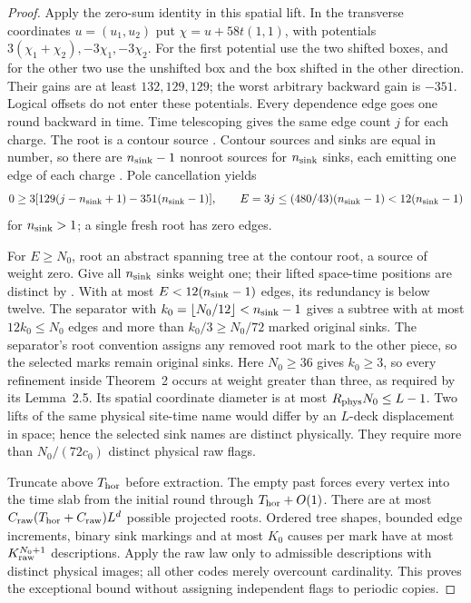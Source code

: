 \begin{proof}
Apply the zero-sum identity \cite[Lemma~41]{SST2026} in this spatial lift.
In the transverse coordinates \(u=(u_1,u_2)\) put
\(\chi=u+58t(1,1)\), with potentials
\(3(\chi_1+\chi_2),-3\chi_1,-3\chi_2\).
For the first potential use the two shifted boxes, and for the other two
use the unshifted box and the box shifted in the other direction.
Their gains are at least \(132,129,129\); the worst arbitrary backward
gain is \(-351\). Logical offsets do not enter these potentials.
Every dependence edge goes one round backward in time. Time telescoping
\cite[(5.13) in the proof of Lemma~38]{SST2026} gives the same edge
count \(j\) for each charge. The root is a contour source
\cite[Definitions~15--16]{SST2026}. Contour sources and sinks are equal in
number, so there are \(n_{\rm sink}-1\) nonroot sources for \(n_{\rm sink}\) sinks, each
emitting one edge of each charge \cite[(5.23) in the proof of Lemma~40]{SST2026}. Pole cancellation yields
\[
 0\ge3[129(j-n_{\rm sink}+1)-351(n_{\rm sink}-1)],\qquad
 E=3j\le(480/43)(n_{\rm sink}-1)<12(n_{\rm sink}-1)
\]
for \(n_{\rm sink}>1\); a single fresh root has zero edges.

For \(E\ge N_0\), root an abstract spanning tree at the contour root,
a source of weight zero. Give all \(n_{\rm sink}\) sinks weight one; their lifted
space-time positions are distinct by \mbox{\cite[Definition~17(i)]{SST2026}}. With at most
\(E<12(n_{\rm sink}-1)\) edges, its redundancy is below twelve. The separator
\mbox{\cite[Definition~2.4, Lemma~2.5 and Theorem~2 (Tree Separator)]{Gacs2021}} with
\(k_0=\lfloor N_0/12\rfloor<n_{\rm sink}-1\) gives a subtree with at most
\(12k_0\le N_0\) edges and more than \(k_0/3\ge N_0/72\) marked
original sinks. The separator's root convention assigns any removed
root mark to the other piece, so the selected marks remain original
sinks. Here \(N_0\ge36\) gives \(k_0\ge3\), so every refinement
inside Theorem~2 occurs at weight greater than three, as required by
its Lemma~2.5. Its spatial coordinate diameter is at most
\(R_{\rm phys}N_0\le L-1\). Two lifts of the same physical site-time
name would differ by an \(L\)-deck displacement in space; hence the
selected sink names are distinct physically. They require more than
\(N_0/(72c_0)\) distinct physical raw flags.

Truncate above \(T_{\rm hor}\) before extraction. The empty past forces every
vertex into the time slab from the initial round through \(T_{\rm hor}+O(1)\). There are at most
\(C_{\rm raw}(T_{\rm hor}+C_{\rm raw})L^d\) possible projected roots. Ordered
tree shapes, bounded edge increments, binary sink markings and at most
\(K_0\) causes per mark have at most \(K_{\rm raw}^{N_0+1}\)
descriptions. Apply the raw law only to admissible descriptions with
distinct physical images; all other codes merely overcount cardinality.
This proves the exceptional bound without assigning independent flags
to periodic copies.


\end{proof}
